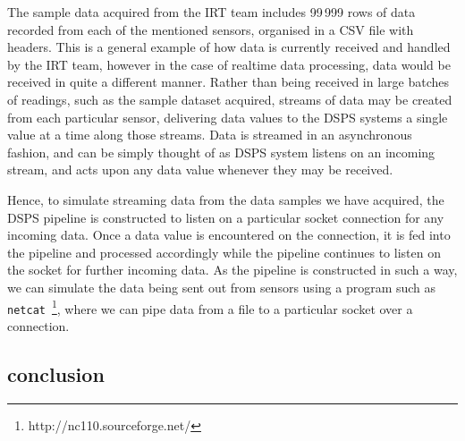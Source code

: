 
The sample data acquired from the IRT team includes 99\,999 rows of data recorded from each of the mentioned sensors,
organised in a CSV file with headers. This is a general example of how data is currently received and handled by the IRT
team, however in the case of realtime data processing, data would be received in quite a different manner. Rather than
being received in large batches of readings, such as the sample dataset acquired, streams of data may be created from
each particular sensor, delivering data values to the DSPS systems a single value at a time along those streams. Data
is streamed in an asynchronous fashion, and can be simply thought of as DSPS system listens on an incoming stream, and
acts upon any data value whenever they may be received.

Hence, to simulate streaming data from the data samples we have acquired, the DSPS pipeline is constructed to listen on
a particular socket connection for any incoming data. Once a data value is encountered on the connection, it is fed into
the pipeline and processed accordingly while the pipeline continues to listen on the socket for further incoming data.
As the pipeline is constructed in such a way, we can simulate the data being sent out from sensors using a program such
as \texttt{netcat}~\footnote{http://nc110.sourceforge.net/}, where we can pipe data from a file to a particular
socket over a connection.


\subsection{conclusion} %
\label{sub:conclusion}

